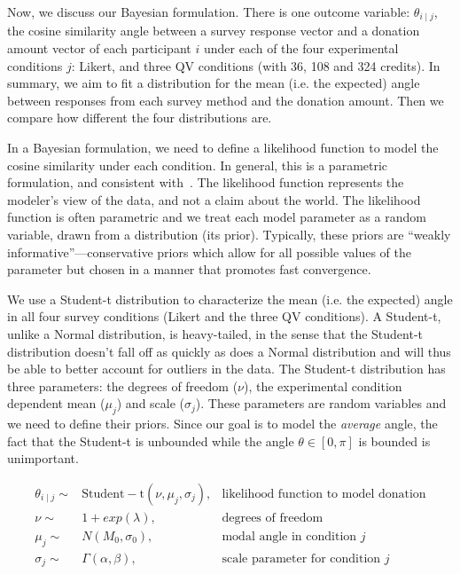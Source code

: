 Now, we discuss our Bayesian formulation. There is one outcome variable: $\theta_{i \mid j}$, the cosine similarity angle between a survey response vector and a donation amount vector of each participant $i$  under each of the four experimental conditions $j$: Likert, and three QV conditions (with 36, 108 and 324 credits). In summary, we aim to fit a distribution for the mean (i.e. the expected) angle between responses from each survey method and the donation amount. Then we compare how different the four distributions are. 

In a Bayesian formulation, we need to define a likelihood function to model the cosine similarity under each condition. In general, this is a parametric formulation, and consistent with~\textcite{McElreath2015}. The likelihood function represents the modeler's view of the data, and not a claim about the world. The likelihood function is often parametric and we treat each model parameter as a random variable, drawn from a distribution (its prior). Typically, these priors are ``weakly informative''---conservative priors which allow for all possible values of the parameter but chosen in a manner that promotes fast convergence.


We use a Student-t distribution to characterize the mean (i.e. the expected) angle in all four survey conditions (Likert and the three QV conditions). A Student-t, unlike a Normal distribution, is heavy-tailed, in the sense that the Student-t distribution doesn't fall off as quickly as does a Normal distribution and will thus be able to better account for outliers in the data. The Student-t distribution has three parameters: the degrees of freedom ($\nu$), the experimental condition dependent mean ($\mu_j$) and scale ($\sigma_j$).  These parameters are random variables and we need to define their priors. Since our goal is to model the \textit{average} angle, the fact that the Student-t is unbounded while the angle $\theta \in [0, \pi]$ is bounded is unimportant.

\begin{align}
  \theta_{i \mid j} \sim & \mathrm{Student-t}(\nu, \mu_j, \sigma_j),   & \text{likelihood function to model donation} \label{eq:bayesian formulation} \\
  \nu \sim & 1 + exp(\lambda), & \text{degrees of freedom} \\
  \mu_j \sim & N(M_0, \sigma_0), & \text{modal angle in condition } j \\
  \sigma_j \sim & \Gamma(\alpha, \beta), & \text{scale parameter for condition } j
\end{align}
 
